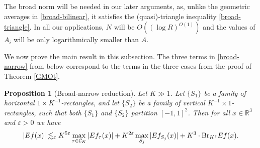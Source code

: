 \documentclass{amsart}%
\numberwithin{equation}{section}
\newtheorem{proposition}[theorem]{Proposition}
\newcommand{\e}{\varepsilon}
\newcommand{\ZR}{\mathbb{R}}
\newcommand{\cC}{{\mathcal C}}
\newcommand{\Br}{{\rm{Br}}}
\newcommand{\1}{\mathbbm{1}}
\begin{document}
The broad norm will be needed in our later arguments, as, unlike the geometric averages in \eqref{broad-bilinear}, it satisfies the (quasi)-triangle inequality \eqref{broad-triangle}. In all our applications, $N$ will be $O((\log R)^{O(1)})$ and the values of $A_i$ will be only logarithmically smaller than $A$.

We now prove the main result in this subsection. The three terms in \eqref{broad-narrow} from below correspond to the terms in the three cases from the proof of Theorem \ref{GMOt}. 

\begin{proposition}[Broad-narrow reduction]
	\label{broad-narrow-lem}
	Let $K\gg 1$.
	Let $\{S_1\}$ be a family of horizontal $1\times K^{-1}$-rectangles, and let $\{S_2\}$ be a family of vertical $K^{-1}\times 1$-rectangles, such that both $\{S_1\}$ and $\{S_2\}$ partition $[-1,1]^2$.
	Then for all $x\in\ZR^3$ and $\e>0$ we have 
	\begin{align}
		\label{broad-narrow}
		|Ef(x)|\lesssim_\e K^{5\e}\max_{\tau\in\cC_K}|Ef_{\tau}(x)|+ K^{2\e}\max_{S_j}|Ef_{S_j}(x)|+K^{3}\cdot\Br_{K^\e} Ef(x).
	\end{align}
\end{proposition}
\end{document}
